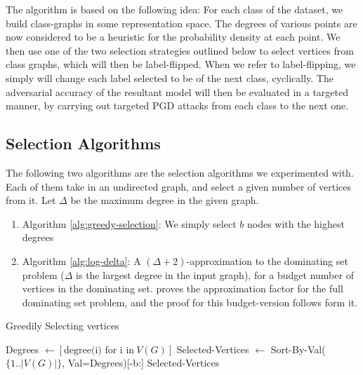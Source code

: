 \documentclass{ociamthesis}
\begin{document}
The algorithm is based on the following idea: For each class of the dataset, we
build class-graphs in some representation space. The degrees of various points
are now considered to be a heuristic for the probability density at each point.
We then use one of the two selection strategies outlined below to select
vertices from class graphs, which will then be label-flipped. When we refer to
label-flipping, we simply will change each label selected to be of the next
class, cyclically. The adversarial accuracy of the resultant model will then be
evaluated in a targeted manner, by carrying out targeted PGD attacks from each
class to the next one.

\subsection*{Selection Algorithms}
The following two algorithms are the selection algorithms we experimented with.
Each of them take in an undirected graph, and select a given number of vertices
from it. Let $\Delta$ be the maximum degree in the given graph.
\begin{enumerate}
    \item Algorithm \ref{alg:greedy-selection}: We simply select $b$ nodes with
    the highest degrees
    \item Algorithm \ref{alg:log-delta}: A $(\Delta + 2)$-approximation to the
    dominating set problem ($\Delta$ is the largest degree in the input graph),
    for a budget number of vertices in the dominating set.
    \citep{dominating-set} proves the approximation factor for the full
    dominating set problem, and the proof for this budget-version follows form
    it.
\end{enumerate}

\begin{algorithm}[!h]
\caption{Greedily Selecting vertices}
\begin{algorithmic}[1]
    \State Degrees $\gets [\text{degree(i) for i in}~V(G)]$
    \State Selected-Vertices $\gets$ Sort-By-Val($\{1..|V(G)|\}$, Val=Degrees)[-b:]
    \State \Return Selected-Vertices
\EndProcedure
\end{algorithmic}
\label{alg:greedy-selection}
\end{algorithm}
\end{document}
